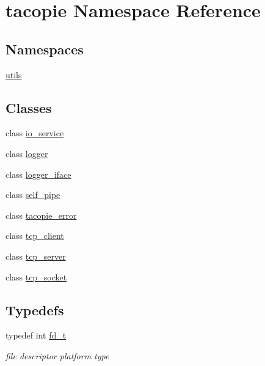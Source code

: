 \hypertarget{namespacetacopie}{}\section{tacopie Namespace Reference}
\label{namespacetacopie}
\subsection*{Namespaces}
\begin{DoxyCompactItemize}
\item 
 \hyperlink{namespacetacopie_1_1utils}{utils}
\end{DoxyCompactItemize}
\subsection*{Classes}
\begin{DoxyCompactItemize}
\item 
class \hyperlink{classtacopie_1_1io__service}{io\+\_\+service}
\item 
class \hyperlink{classtacopie_1_1logger}{logger}
\item 
class \hyperlink{classtacopie_1_1logger__iface}{logger\+\_\+iface}
\item 
class \hyperlink{classtacopie_1_1self__pipe}{self\+\_\+pipe}
\item 
class \hyperlink{classtacopie_1_1tacopie__error}{tacopie\+\_\+error}
\item 
class \hyperlink{classtacopie_1_1tcp__client}{tcp\+\_\+client}
\item 
class \hyperlink{classtacopie_1_1tcp__server}{tcp\+\_\+server}
\item 
class \hyperlink{classtacopie_1_1tcp__socket}{tcp\+\_\+socket}
\end{DoxyCompactItemize}
\subsection*{Typedefs}
\begin{DoxyCompactItemize}
\item 
typedef int \hyperlink{namespacetacopie_acce7ad26b2d30156b1e6fa353f727026}{fd\+\_\+t}
\begin{DoxyCompactList}\small\item\em file descriptor platform type \end{DoxyCompactList}\end{DoxyCompactItemize}
